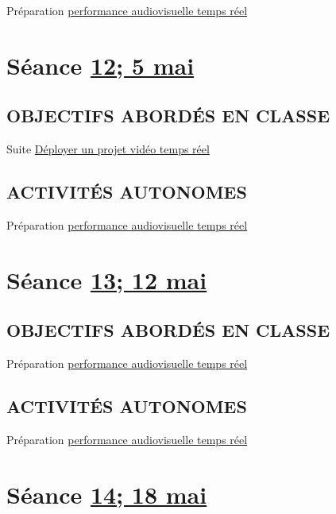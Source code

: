 \documentclass[
  french,
]{book}
\begin{document}
Préparation \protect\hyperlink{sommatif_5}{performance audiovisuelle temps réel}

\hypertarget{semaine_14}{%
\section{\texorpdfstring{Séance \protect\hyperlink{semaine_14}{12; 5 mai}}{Séance 12; 5 mai}}\label{semaine_14}}

\hypertarget{objectifs-aborduxe9s-en-classe-13}{%
\subsection{OBJECTIFS ABORDÉS EN CLASSE}\label{objectifs-aborduxe9s-en-classe-13}}

Suite \protect\hyperlink{deployer}{Déployer un projet vidéo temps réel}

\hypertarget{activituxe9s-autonomes-13}{%
\subsection{ACTIVITÉS AUTONOMES}\label{activituxe9s-autonomes-13}}

Préparation \protect\hyperlink{sommatif_5}{performance audiovisuelle temps réel}

\hypertarget{semaine_15}{%
\section{\texorpdfstring{Séance \protect\hyperlink{semaine_15}{13; 12 mai}}{Séance 13; 12 mai}}\label{semaine_15}}

\hypertarget{objectifs-aborduxe9s-en-classe-14}{%
\subsection{OBJECTIFS ABORDÉS EN CLASSE}\label{objectifs-aborduxe9s-en-classe-14}}

Préparation \protect\hyperlink{sommatif_5}{performance audiovisuelle temps réel}

\hypertarget{activituxe9s-autonomes-14}{%
\subsection{ACTIVITÉS AUTONOMES}\label{activituxe9s-autonomes-14}}

Préparation \protect\hyperlink{sommatif_5}{performance audiovisuelle temps réel}

\hypertarget{semaine_16}{%
\section{\texorpdfstring{Séance \protect\hyperlink{semaine_16}{14; 18 mai}}{Séance 14; 18 mai}}\label{semaine_16}}
\end{document}

